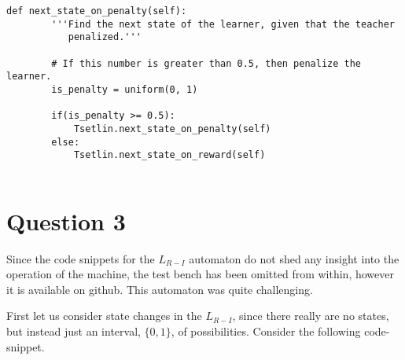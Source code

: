 \documentclass[10pt,english]{article}
\begin{document}
\clearpage
\begin{lstlisting}[label={list:first},caption=Krylov core code.] 
def next_state_on_penalty(self):
        '''Find the next state of the learner, given that the teacher
           penalized.'''

        # If this number is greater than 0.5, then penalize the learner.
        is_penalty = uniform(0, 1)

        if(is_penalty >= 0.5):
            Tsetlin.next_state_on_penalty(self)
        else:
            Tsetlin.next_state_on_reward(self)
   
\end{lstlisting}

\section{Question 3}
Since the code snippets for the $L_{R-I}$ automaton do not shed any insight into the operation of the machine, the test bench has been omitted from within, however it is available on github.  This automaton was quite challenging. 

First let us consider state changes in the $L_{R-I}$, since there really are no states, but instead just an interval, $\lbrace0, 1\rbrace$, of possibilities.  Consider the following code-snippet.
\end{document}

